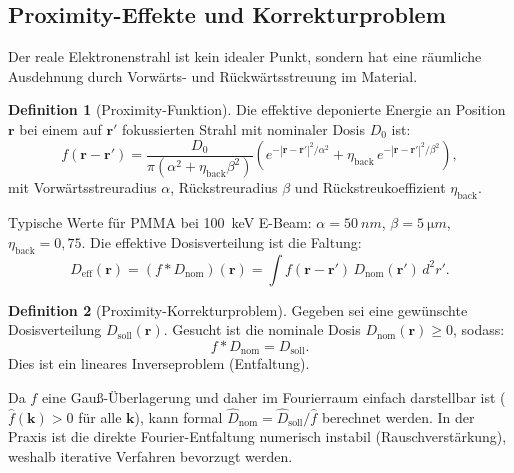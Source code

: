 ﻿\documentclass[a4paper,12pt]{article}
\theoremstyle{definition}
\newtheorem{definition}{Definition}[section]
\newcommand{\vect}[1]{\bm{#1}}
\begin{document}
	\subsection{Proximity-Effekte und Korrekturproblem}
	
	Der reale Elektronenstrahl ist kein idealer Punkt, sondern hat eine
	räumliche Ausdehnung durch Vorwärts- und Rückwärtsstreuung im Material.
	
	\begin{definition}[Proximity-Funktion]
		\label{def:proximity}
		Die effektive deponierte Energie an Position $\vect{r}$ bei einem auf
		$\vect{r}'$ fokussierten Strahl mit nominaler Dosis $D_0$ ist:
		\begin{equation}
			f(\vect{r} - \vect{r}') = \frac{D_0}{\pi(\alpha^2 + \eta_\mathrm{back}\beta^2)}
			\left(
			e^{-|\vect{r}-\vect{r}'|^2/\alpha^2}
			+ \eta_\mathrm{back}\, e^{-|\vect{r}-\vect{r}'|^2/\beta^2}
			\right),
			\label{eq:proximity}
		\end{equation}
		mit Vorwärtsstreuradius $\alpha$, Rückstreuradius $\beta$ und
		Rückstreukoeffizient $\eta_\mathrm{back}$.
	\end{definition}
	
	Typische Werte für PMMA bei \SI{100}{keV} E-Beam:
	$\alpha = \SI{50}{nm}$, $\beta = \SI{5}{\micro m}$, $\eta_\mathrm{back} = 0{,}75$.
	Die effektive Dosisverteilung ist die Faltung:
	\begin{equation}
		D_\mathrm{eff}(\vect{r}) = (f * D_\mathrm{nom})(\vect{r})
		= \int f(\vect{r} - \vect{r}')\, D_\mathrm{nom}(\vect{r}')\, d^2r'.
		\label{eq:faltung}
	\end{equation}
	
	\begin{definition}[Proximity-Korrekturproblem]
		\label{def:proximity-korrektur}
		Gegeben sei eine gewünschte Dosisverteilung $D_\mathrm{soll}(\vect{r})$.
		Gesucht ist die nominale Dosis $D_\mathrm{nom}(\vect{r}) \geq 0$, sodass:
		\begin{equation}
			f * D_\mathrm{nom} = D_\mathrm{soll}.
			\label{eq:proximity-korrekturproblem}
		\end{equation}
		Dies ist ein lineares Inverseproblem (Entfaltung).
	\end{definition}
	
	Da $f$ eine Gauß-Überlagerung und daher im Fourierraum einfach darstellbar
	ist ($\hat{f}(\vect{k}) > 0$ für alle $\vect{k}$), kann formal
	$\hat{D}_\mathrm{nom} = \hat{D}_\mathrm{soll}/\hat{f}$ berechnet werden.
	In der Praxis ist die direkte Fourier-Entfaltung numerisch instabil
	(Rauschverstärkung), weshalb iterative Verfahren bevorzugt werden.
	
\end{document}
